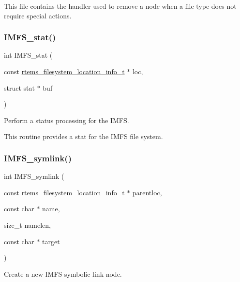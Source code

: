 This file contains the handler used to remove a node when a file type does not require special actions. \mbox{\label{group__IMFS_gae973c8964e50b22d9c1171ef38d4eaa7}} 
\subsubsection{\texorpdfstring{IMFS\_stat()}{IMFS\_stat()}}
{\footnotesize\ttfamily int I\+M\+F\+S\+\_\+stat (\begin{DoxyParamCaption}\item[{const \mbox{\hyperlink{group__LibIO_ga3252b3d31ee3c49ffff0b7604a676864}{rtems\+\_\+filesystem\+\_\+location\+\_\+info\+\_\+t}} $\ast$}]{loc,  }\item[{struct stat $\ast$}]{buf }\end{DoxyParamCaption})}



Perform a status processing for the I\+M\+FS. 

This routine provides a stat for the I\+M\+FS file system. \mbox{\label{group__IMFS_ga7a51f947488c9d574dfb8da0a9e295bd}} 
\subsubsection{\texorpdfstring{IMFS\_symlink()}{IMFS\_symlink()}}
{\footnotesize\ttfamily int I\+M\+F\+S\+\_\+symlink (\begin{DoxyParamCaption}\item[{const \mbox{\hyperlink{group__LibIO_ga3252b3d31ee3c49ffff0b7604a676864}{rtems\+\_\+filesystem\+\_\+location\+\_\+info\+\_\+t}} $\ast$}]{parentloc,  }\item[{const char $\ast$}]{name,  }\item[{size\+\_\+t}]{namelen,  }\item[{const char $\ast$}]{target }\end{DoxyParamCaption})}



Create a new I\+M\+FS symbolic link node. 

